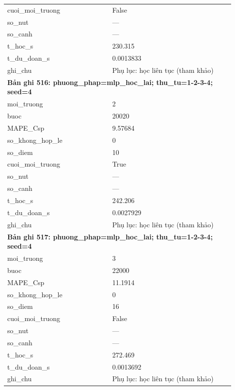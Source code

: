 \begin{longtable}{p{0.43\linewidth}p{0.50\linewidth}}
cuoi\_\allowbreak moi\_\allowbreak truong & False \\
so\_\allowbreak nut & — \\
so\_\allowbreak canh & — \\
t\_\allowbreak hoc\_\allowbreak s & 230.315 \\
t\_\allowbreak du\_\allowbreak doan\_\allowbreak s & 0.0013833 \\
ghi\_\allowbreak chu & Phụ lục: học liên tục (tham khảo) \\
\midrule
\multicolumn{2}{p{0.95\linewidth}}{\textbf{Bản ghi 516: phuong\_phap=mlp\_hoc\_lai; thu\_tu=1-2-3-4; seed=4}} \\
moi\_\allowbreak truong & 2 \\
buoc & 20020 \\
MAPE\_\allowbreak Csp & 9.57684 \\
so\_\allowbreak khong\_\allowbreak hop\_\allowbreak le & 0 \\
so\_\allowbreak diem & 10 \\
cuoi\_\allowbreak moi\_\allowbreak truong & True \\
so\_\allowbreak nut & — \\
so\_\allowbreak canh & — \\
t\_\allowbreak hoc\_\allowbreak s & 242.206 \\
t\_\allowbreak du\_\allowbreak doan\_\allowbreak s & 0.0027929 \\
ghi\_\allowbreak chu & Phụ lục: học liên tục (tham khảo) \\
\midrule
\multicolumn{2}{p{0.95\linewidth}}{\textbf{Bản ghi 517: phuong\_phap=mlp\_hoc\_lai; thu\_tu=1-2-3-4; seed=4}} \\
moi\_\allowbreak truong & 3 \\
buoc & 22000 \\
MAPE\_\allowbreak Csp & 11.1914 \\
so\_\allowbreak khong\_\allowbreak hop\_\allowbreak le & 0 \\
so\_\allowbreak diem & 16 \\
cuoi\_\allowbreak moi\_\allowbreak truong & False \\
so\_\allowbreak nut & — \\
so\_\allowbreak canh & — \\
t\_\allowbreak hoc\_\allowbreak s & 272.469 \\
t\_\allowbreak du\_\allowbreak doan\_\allowbreak s & 0.0013692 \\
ghi\_\allowbreak chu & Phụ lục: học liên tục (tham khảo) \\

\end{longtable}
